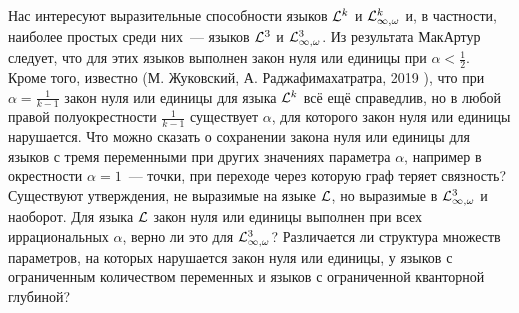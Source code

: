 Нас интересуют выразительные способности языков $\mathcal{L}^k$ и $\mathcal{L}^k_{\infty, \omega}$ и, в частности, наиболее простых среди них~--- языков  $\mathcal{L}^3$ и $\mathcal{L}^3_{\infty, \omega}$.
Из результата МакАртур \cite{mcarthur1997asymptotic} следует, что для этих языков выполнен закон нуля или единицы при $\alpha < \frac{1}{2}$.
Кроме того, известно (М. Жуковский, А. Раджафимахатратра, 2019 \cite{razafimahatratra2019zero}), что при $\alpha = \frac{1}{k-1}$ закон нуля или единицы для языка $\mathcal{L}^k$ всё ещё справедлив, но в любой правой полуокрестности $\frac{1}{k-1}$ существует $\alpha$, для которого закон нуля или единицы нарушается.
Что можно сказать о сохранении закона нуля или единицы для языков с тремя переменными при других значениях параметра $\alpha$, например в окрестности $\alpha=1$~--- точки, при переходе через которую граф теряет связность?
Существуют утверждения, не выразимые на языке $\mathcal{L}$, но выразимые в $\mathcal{L}^3_{\infty, \omega}$ и наоборот.
Для языка $\mathcal{L}$ закон нуля или единицы выполнен при всех иррациональных $\alpha$, верно ли это для $\mathcal{L}^3_{\infty, \omega}$?
Различается ли структура множеств параметров, на которых нарушается закон нуля или единицы, у языков с ограниченным количеством переменных и языков с ограниченной кванторной глубиной? 